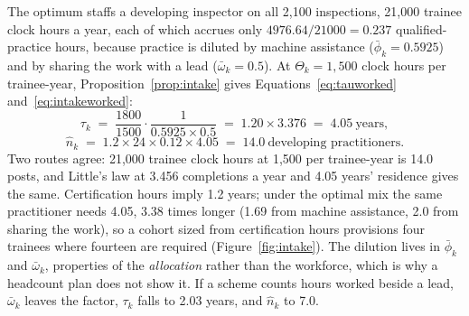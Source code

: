 \documentclass[utf8]{FrontiersinHarvard}
\begin{document}
	The optimum staffs a developing inspector on all 2{,}100 inspections, 21{,}000 trainee clock hours a year, each of which accrues only $4976.64/21000=0.237$ qualified-practice hours, because practice is diluted by machine assistance ($\bar\phi_k=0.5925$) and by sharing the work with a lead ($\bar\omega_k=0.5$). At $\Theta_k=1{,}500$ clock hours per trainee-year, Proposition~\ref{prop:intake} gives Equations~\eqref{eq:tauworked} and~\eqref{eq:intakeworked}:
	\begin{equation}
		\tau_k \;=\; \frac{1800}{1500}\cdot\frac{1}{0.5925 \times 0.5} \;=\; 1.20 \times 3.376 \;=\; 4.05 \ \text{years},
		\label{eq:tauworked}
	\end{equation}
	\begin{equation}
		\hat n_k \;=\; 1.2 \times 24 \times 0.12 \times 4.05 \;=\; 14.0 \ \text{developing practitioners}.
		\label{eq:intakeworked}
	\end{equation}
	Two routes agree: 21{,}000 trainee clock hours at 1{,}500 per trainee-year is 14.0 posts, and Little's law at 3.456 completions a year and 4.05 years' residence gives the same. Certification hours imply 1.2 years; under the optimal mix the same practitioner needs 4.05, 3.38 times longer (1.69 from machine assistance, 2.0 from sharing the work), so a cohort sized from certification hours provisions four trainees where fourteen are required (Figure~\ref{fig:intake}). The dilution lives in $\bar\phi_k$ and $\bar\omega_k$, properties of the \textit{allocation} rather than the workforce, which is why a headcount plan does not show it. If a scheme counts hours worked beside a lead, $\bar\omega_k$ leaves the factor, $\tau_k$ falls to 2.03 years, and $\hat n_k$ to 7.0.
\end{document}
